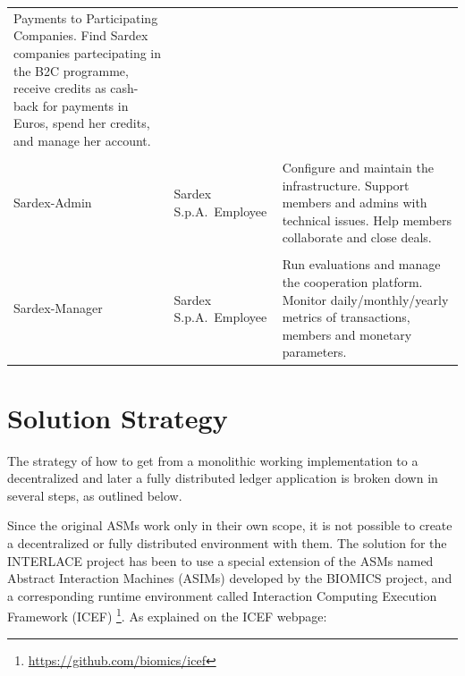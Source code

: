 {\begin{longtable}[]{@{}lll@{}}
\begin{minipage}[t]{0.45\columnwidth}Payments to Participating Companies. Find Sardex companies partecipating in the B2C programme, receive credits as cash-back for payments in Euros, spend her credits, and manage her account.\end{minipage}
\tabularnewline
\tabularnewline
\begin{minipage}[t]{0.18\columnwidth}Sardex-Admin \end{minipage} &
\begin{minipage}[t]{0.25\columnwidth}Sardex S.p.A.\ Employee \end{minipage} &
\begin{minipage}[t]{0.45\columnwidth}Configure and maintain the infrastructure. Support members and admins with technical issues. Help members collaborate and close deals.\end{minipage}
\tabularnewline
\tabularnewline
\begin{minipage}[t]{0.18\columnwidth}Sardex-Manager \end{minipage} &
\begin{minipage}[t]{0.25\columnwidth}Sardex S.p.A.\ Employee \end{minipage} &
\begin{minipage}[t]{0.45\columnwidth}Run evaluations and manage the cooperation platform. Monitor daily/monthly/yearly metrics of transactions, members and monetary parameters. \end{minipage}
\tabularnewline
\bottomrule
\end{longtable}
}

\section{Solution Strategy}\label{section-solution-strategy}
The strategy of how to get from a monolithic working implementation to a decentralized and later a fully distributed ledger application is broken down in several steps, as outlined below.

Since the original ASMs work only in their own scope, it is not possible to create a decentralized or fully distributed environment with them. The solution for the INTERLACE project has been to use a special extension of the ASMs named Abstract Interaction Machines (ASIMs) developed by the BIOMICS project, and a corresponding runtime environment called Interaction Computing Execution Framework (ICEF) \footnote{\url{https://github.com/biomics/icef}}. As explained on the ICEF webpage:

